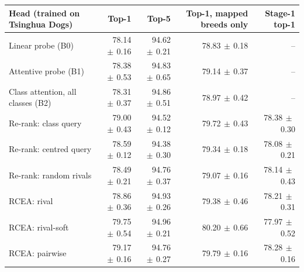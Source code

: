 \begin{tabular}{lrrrr}
\toprule
Head (trained on Tsinghua Dogs) & Top-1 & Top-5 & Top-1, mapped breeds only & Stage-1 top-1 \\
\midrule
Linear probe (B0) & 78.14{\scriptsize$\,\pm\,$0.16} & 94.62{\scriptsize$\,\pm\,$0.21} & 78.83{\scriptsize$\,\pm\,$0.18} & -- \\
Attentive probe (B1) & 78.38{\scriptsize$\,\pm\,$0.53} & 94.83{\scriptsize$\,\pm\,$0.65} & 79.14{\scriptsize$\,\pm\,$0.37} & -- \\
Class attention, all classes (B2) & 78.31{\scriptsize$\,\pm\,$0.37} & 94.86{\scriptsize$\,\pm\,$0.51} & 78.97{\scriptsize$\,\pm\,$0.42} & -- \\
Re-rank: class query & 79.00{\scriptsize$\,\pm\,$0.43} & 94.52{\scriptsize$\,\pm\,$0.12} & 79.72{\scriptsize$\,\pm\,$0.43} & 78.38{\scriptsize$\,\pm\,$0.30} \\
Re-rank: centred query & 78.59{\scriptsize$\,\pm\,$0.12} & 94.38{\scriptsize$\,\pm\,$0.30} & 79.34{\scriptsize$\,\pm\,$0.18} & 78.08{\scriptsize$\,\pm\,$0.21} \\
Re-rank: random rivals & 78.49{\scriptsize$\,\pm\,$0.21} & 94.76{\scriptsize$\,\pm\,$0.37} & 79.07{\scriptsize$\,\pm\,$0.16} & 78.14{\scriptsize$\,\pm\,$0.43} \\
RCEA: rival & 78.86{\scriptsize$\,\pm\,$0.36} & 94.93{\scriptsize$\,\pm\,$0.26} & 79.38{\scriptsize$\,\pm\,$0.46} & 78.21{\scriptsize$\,\pm\,$0.31} \\
RCEA: rival-soft & 79.75{\scriptsize$\,\pm\,$0.54} & 94.96{\scriptsize$\,\pm\,$0.21} & 80.20{\scriptsize$\,\pm\,$0.66} & 77.97{\scriptsize$\,\pm\,$0.52} \\
RCEA: pairwise & 79.17{\scriptsize$\,\pm\,$0.16} & 94.76{\scriptsize$\,\pm\,$0.27} & 79.79{\scriptsize$\,\pm\,$0.16} & 78.28{\scriptsize$\,\pm\,$0.16} \\
\bottomrule
\end{tabular}
